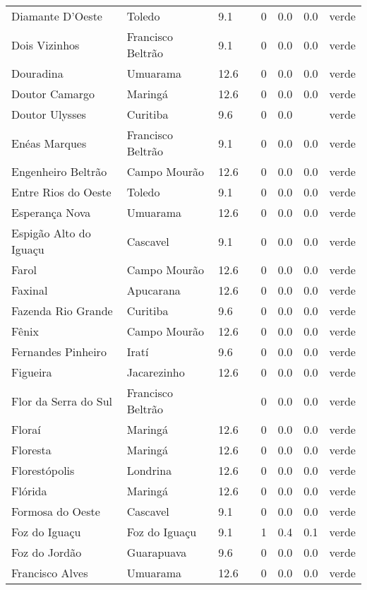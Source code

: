 \begin{longtable}{l|lllllll}
  Diamante D'Oeste & Toledo & 9.1 &  & 0 & 0.0 & 0.0 & verde \\ 
  Dois Vizinhos & Francisco Beltrão & 9.1 &  & 0 & 0.0 & 0.0 & verde \\ 
  Douradina & Umuarama & 12.6 &  & 0 & 0.0 & 0.0 & verde \\ 
  Doutor Camargo & Maringá & 12.6 &  & 0 & 0.0 & 0.0 & verde \\ 
  Doutor Ulysses & Curitiba & 9.6 &  & 0 & 0.0 &  & verde \\ 
  Enéas Marques & Francisco Beltrão & 9.1 &  & 0 & 0.0 & 0.0 & verde \\ 
  Engenheiro Beltrão & Campo Mourão & 12.6 &  & 0 & 0.0 & 0.0 & verde \\ 
  Entre Rios do Oeste & Toledo & 9.1 &  & 0 & 0.0 & 0.0 & verde \\ 
  Esperança Nova & Umuarama & 12.6 &  & 0 & 0.0 & 0.0 & verde \\ 
  Espigão Alto do Iguaçu & Cascavel & 9.1 &  & 0 & 0.0 & 0.0 & verde \\ 
  Farol & Campo Mourão & 12.6 &  & 0 & 0.0 & 0.0 & verde \\ 
  Faxinal & Apucarana & 12.6 &  & 0 & 0.0 & 0.0 & verde \\ 
  Fazenda Rio Grande & Curitiba & 9.6 &  & 0 & 0.0 & 0.0 & verde \\ 
  Fênix & Campo Mourão & 12.6 &  & 0 & 0.0 & 0.0 & verde \\ 
  Fernandes Pinheiro & Iratí & 9.6 &  & 0 & 0.0 & 0.0 & verde \\ 
  Figueira & Jacarezinho & 12.6 &  & 0 & 0.0 & 0.0 & verde \\ 
  Flor da Serra do Sul & Francisco Beltrão &  &  & 0 & 0.0 & 0.0 & verde \\ 
  Floraí & Maringá & 12.6 &  & 0 & 0.0 & 0.0 & verde \\ 
  Floresta & Maringá & 12.6 &  & 0 & 0.0 & 0.0 & verde \\ 
  Florestópolis & Londrina & 12.6 &  & 0 & 0.0 & 0.0 & verde \\ 
  Flórida & Maringá & 12.6 &  & 0 & 0.0 & 0.0 & verde \\ 
  Formosa do Oeste & Cascavel & 9.1 &  & 0 & 0.0 & 0.0 & verde \\ 
  Foz do Iguaçu & Foz do Iguaçu & 9.1 &  & 1 & 0.4 & 0.1 & verde \\ 
  Foz do Jordão & Guarapuava & 9.6 &  & 0 & 0.0 & 0.0 & verde \\ 
  Francisco Alves & Umuarama & 12.6 &  & 0 & 0.0 & 0.0 & verde \\ 

\end{longtable}
